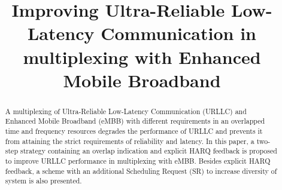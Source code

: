 \documentclass[conference]{IEEEtran}
\begin{document}
\title{Improving Ultra-Reliable Low-Latency Communication in multiplexing with Enhanced Mobile Broadband\\
}

\author{
\and
{}
}

\maketitle

\begin{abstract}
A multiplexing of Ultra-Reliable Low-Latency Communication (URLLC) and Enhanced Mobile Broadband (eMBB) with different requirements in an overlapped time and frequency resources degrades the performance of URLLC and prevents it from attaining the strict requirements of reliability and latency. In this paper, a two-step strategy containing an overlap indication and explicit HARQ feedback is proposed to improve URLLC performance in multiplexing with eMBB. Besides explicit HARQ feedback, a scheme with an additional Scheduling Request (SR) to increase diversity of system is also presented.

\end{abstract}
\end{document}
